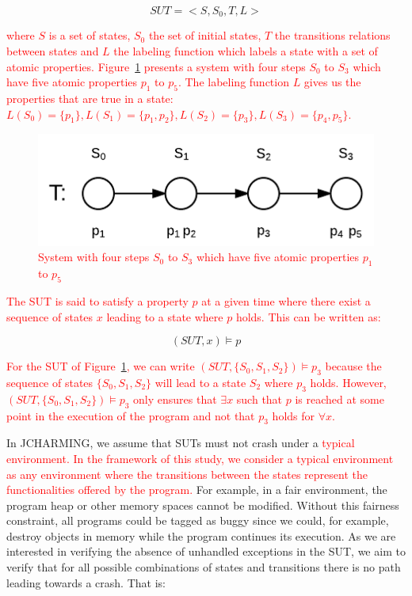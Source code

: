 \documentclass[times, doublespace]{smrauth}
\newcommand{\red}[1]{\textcolor{red}{#1}}
\begin{document}
\begin{equation}
SUT = <S, S_0, T, L>
\end{equation}

\red{\noindent where $S$ is a set of states, $S_0$ the set of initial states, $T$ the transitions relations between states and $L$ the labeling function which labels a state with a set of atomic properties.
Figure~\ref{fig:mc-def} presents a system with four steps $S_0$ to $S_3$ which have five atomic properties $p_1$ to $p_5$.
The labeling function $L$ gives us the properties that are true in a state: $L(S_0) = \{p_1\}, L(S_1) = \{p_1, p_2\}, L(S_2) = \{p_3\}, L(S_3) = \{p_4, p_5\}$.}

\begin{figure}[h!]
  \centering
    \includegraphics[scale=0.4]{media/mc-def.png}
    \caption{\red{System with four steps $S_0$ to $S_3$ which have five atomic properties $p_1$ to $p_5$}
    \label{fig:mc-def}}
\end{figure}


\red{The SUT is said to satisfy a property $p$ at a given time where there exist a sequence of states $x$ leading to a state where $p$ holds.
This can be written as:}

\begin{equation}
(SUT, x) \models p
\end{equation}

\red{For the SUT of Figure~\ref{fig:mc-def}, we can write $(SUT, \{S_0, S_1, S_2\}) \models p_3$ because the sequence of states $\{S_0, S_1, S_2\}$ will lead to a state $S_2$ where $p_3$ holds. However, $(SUT, \{S_0, S_1, S_2\}) \models p_3$ only ensures that $\exists x$ such that $p$ is reached
at some point in the execution of the program and not that $p_3$ holds
for $\forall x$.}

In JCHARMING, we assume that SUTs
must not crash under a \red{typical environment.
In the framework of this study, we consider a typical environment
as any environment where the transitions between the states
represent the functionalities offered by the program.}
For example, in a fair environment, the program heap or other
memory spaces cannot be modified. Without this fairness constraint,
all programs could be tagged as buggy since we could, for example,
destroy objects in memory while the program continues its execution.
As we are interested in verifying the absence of unhandled exceptions
in the SUT, we aim to verify that for all possible combinations of
states and transitions there is no path leading towards a crash. That is:
\end{document}
